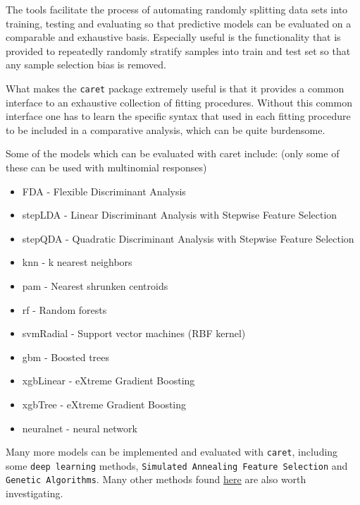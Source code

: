 \documentclass[
]{book}
\providecommand{\tightlist}{%
  \setlength{\itemsep}{0pt}\setlength{\parskip}{0pt}}
\begin{document}
The tools facilitate the process of automating randomly splitting data sets into training,
testing and evaluating so that predictive models can be evaluated on a comparable and
exhaustive basis. Especially useful is the functionality that is provided to
repeatedly randomly stratify samples into train and test set so that any
sample selection bias is removed.

What makes the \texttt{caret} package extremely useful is that it provides a common interface
to an exhaustive collection of fitting procedures. Without
this common interface one has to learn the specific syntax that
used in each fitting procedure to be included in a comparative analysis,
which can be quite burdensome.

Some of the models which can be evaluated with caret include:
(only some of these can be used with multinomial responses)

\begin{itemize}
\tightlist
\item
  FDA - Flexible Discriminant Analysis\\
\item
  stepLDA - Linear Discriminant Analysis with Stepwise Feature Selection\\
\item
  stepQDA - Quadratic Discriminant Analysis with Stepwise Feature Selection\\
\item
  knn - k nearest neighbors\\
\item
  pam - Nearest shrunken centroids\\
\item
  rf - Random forests\\
\item
  svmRadial - Support vector machines (RBF kernel)\\
\item
  gbm - Boosted trees\\
\item
  xgbLinear - eXtreme Gradient Boosting\\
\item
  xgbTree - eXtreme Gradient Boosting\\
\item
  neuralnet - neural network
\end{itemize}

Many more models can be implemented and evaluated with \texttt{caret},
including some \texttt{deep\ learning} methods, \texttt{Simulated\ Annealing\ Feature\ Selection}
and \texttt{Genetic\ Algorithms}.
Many other methods found \href{https://topepo.github.io/caret/available-models.html}{here}
are also worth investigating.
\end{document}
